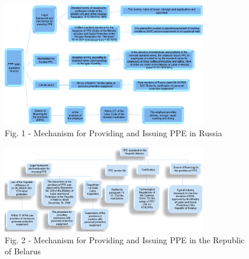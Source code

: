 \begin{figure}[H]
	\centering
	\includegraphics[width=0.8\textwidth]{media/chem2/image2}
	\caption*{Fig. 1 - Mechanism for Providing and Issuing PPE in Russia}
\end{figure}

\begin{figure}[H]
	\centering
	\includegraphics[width=0.8\textwidth]{media/chem2/image3}
	\caption*{Fig. 2 - Mechanism for Providing and Issuing PPE in the Republic of Belarus}
\end{figure}

